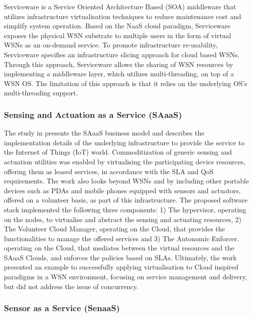 Serviceware \cite{6529470} is a Service Oriented Architecture Based (SOA) middleware that utilizes infrastructure virtualisation techniques to reduce maintenance cost and simplify system operation. Based on the NaaS cloud paradigm, Serviceware exposes the physical WSN substrate to multiple users in the form of virtual WSNs as an on-demand service. To promote infrastructure re-usability, Serviceware specifies an infrastructure slicing approach for cloud based WSNs. Through this approach, Serviceware allows the sharing of WSN resources by implementing a middleware layer, which utilizes multi-threading, on top of a WSN OS. The limitation of this approach is that it relies on the underlying OS's multi-threading support.



\subsubsection{Sensing and Actuation as a Service (SAaaS)}
The study in \cite{SAaaS} presents the SAaaS business model and describes the implementation details of the underlying infrastructure to provide the service to the Internet of Things (IoT) world. Commoditization of generic sensing and actuation utilities was enabled by virtualising the participating device resources, offering them as leased services, in accordance with the SLA and QoS requirements. The work also looks beyond WSNs and by including other portable devices such as PDAs and mobile phones equipped with sensors and actuators, offered on a volunteer basis, as part of this infrastructure. The proposed software stack implemented the following three components: 1) The hypervisor, operating on the nodes, to virtualise and abstract the sensing and actuating resources, 2) The Volunteer Cloud Manager, operating on the Cloud, that provides the functionalities to manage the offered services and 3) The Autonomic Enforcer. operating on the Cloud, that mediates between the virtual resources and the SAaaS Clouds, and enforces the policies based on SLAs. Ultimately, the work presented an example to successfully applying virtualisation to Cloud inspired paradigms in a WSN environment, focusing on service management and delivery, but did not address the issue of concurrency.  


\subsubsection{Sensor as a Service (SenaaS)}

